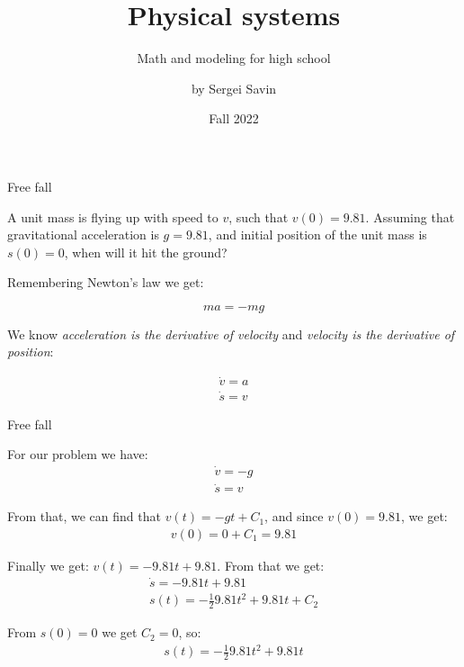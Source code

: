 \documentclass{beamer}
\title{Physical systems}
\subtitle{Math and modeling for high school}
\author{by Sergei Savin}
\date{Fall 2022}
\begin{document}
\maketitle


\begin{frame}{Free fall}
	\begin{flushleft}
		
		A unit mass is flying up with speed to $v$, such that $v(0) = 9.81$. Assuming that gravitational acceleration is $g = 9.81$, and initial position of the unit mass is $s(0) = 0$, when will it hit the ground?
		
		\bigskip
		
		Remembering Newton's law we get:
		
		$$ma = - mg$$
		
		We know \emph{acceleration is the derivative of velocity} and \emph{velocity is the derivative of position}:
		
		\begin{align}
			\dot v = a \\
			\dot s = v
		\end{align}
		
		
	\end{flushleft}
\end{frame}



\begin{frame}{Free fall}
	\begin{flushleft}
		
		For our problem we have:
		\begin{align}
			\dot v = -g \\
			\dot s = v
		\end{align}
		
		From that, we can find that $v(t) = -g t + C_1$, and since $v(0) = 9.81$, we get:
		\begin{align}
	v(0) = 0+ C_1 = 9.81
		\end{align}		
	
	Finally we get: $v(t) = - 9.81 t +  9.81$. From that we get:
		\begin{align}
			\dot s = - 9.81 t+  9.81 \\
			s(t) = -\frac{1}{2} 9.81 t^2 +  9.81t + C_2 
		\end{align}			
	
	From $s(0) = 0$ we get $ C_2 = 0$, so:
		\begin{align}
	s(t) = -\frac{1}{2} 9.81 t^2 +  9.81t 
		\end{align}					
		
	\end{flushleft}
\end{frame}
\end{document}
